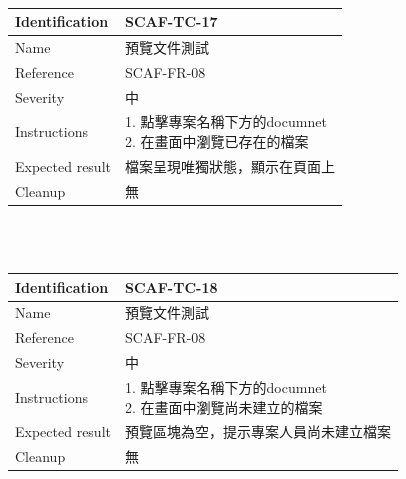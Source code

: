 \documentclass{report}
\begin{document}
\newline
\\
\begin{tabularx}{\textwidth}{
  |p{}%
  |p{}|%
  }
  \hline
  \centering Identification &  SCAF-TC-17 \\
  \hline
  \centering Name & 預覽文件測試 \\
  \hline
  \centering Reference & SCAF-FR-08 \\
  \hline
  \centering Severity & 中 \\
  \hline
 \centering Instructions & 
  \makecell[l]{
    1. 點擊專案名稱下方的documnet \\
    2. 在畫面中瀏覽已存在的檔案
  }\\
  \hline
  \centering Expected result & 檔案呈現唯獨狀態，顯示在頁面上 \\
  \hline
  \centering Cleanup & 無 \\
  \hline
\end{tabularx}
\\
\newline
\\
\begin{tabularx}{\textwidth}{
  |p{}%
  |p{}|%
  }
  \hline
  \centering Identification &  SCAF-TC-18 \\
  \hline
  \centering Name & 預覽文件測試 \\
  \hline
  \centering Reference & SCAF-FR-08 \\
  \hline
  \centering Severity & 中 \\
  \hline
 \centering Instructions & 
  \makecell[l]{
    1. 點擊專案名稱下方的documnet \\
    2. 在畫面中瀏覽尚未建立的檔案
  }\\
  \hline
  \centering Expected result & 預覽區塊為空，提示專案人員尚未建立檔案 \\
  \hline
  \centering Cleanup & 無 \\
  \hline
\end{tabularx}
\\
\newline
\\
\end{document}
